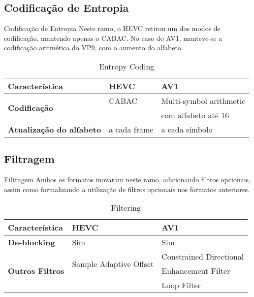 \documentclass{beamer}
\begin{document}
\subsection{Codificação de Entropia}
\begin{frame}{Codificação de Entropia}
	Neste ramo, o HEVC retirou um dos modos de codificação, mantendo apenas o CABAC. No caso do AV1, manteve-se a codificação aritmética do VP9, com o aumento do alfabeto.
	\begin{table}
		\centering
		\begin{tabular}{l|l|l}
			\textbf{Característica} 													& \textbf{HEVC} 	& \textbf{AV1} \\\hline
			\multirow{2}{*}{\textbf{Codificação}}							& CABAC			 			& Multi-symbol arithmetic \\
																												&									& com alfabeto até 16 \\
			\textbf{Atualização do alfabeto}									& a cada frame		& a cada símbolo \\
		\end{tabular}
		\caption{\label{tab:entropy}Entropy Coding}
	\end{table}
\end{frame}

\subsection{Filtragem}
\begin{frame}{Filtragem}
	Ambos os formatos inovaram neste ramo, adicionando filtros opcionais, assim como formalizando a utilização de filtros opcionais nos formatos anteriores.
	\begin{table}
		\centering
		\begin{tabular}{l|l|l}
			\textbf{Característica} 													& \textbf{HEVC} 	& \textbf{AV1} \\\hline
			\textbf{De-blocking}															& Sim			 				& Sim \\
			\multirow{3}{*}{\textbf{Outros Filtros}}					&	\multirow{2}{*}{Sample Adaptive Offset}	& Constrained Directional \\
			 																									&													&  Enhancement Filter\\
																												&													&	Loop Filter \\
		\end{tabular}
		\caption{\label{tab:filtering}Filtering}
	\end{table}
\end{frame}
\end{document}
